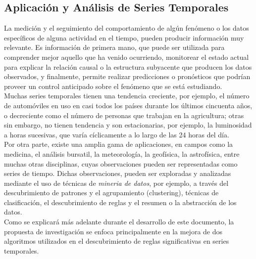 \subsection{Aplicaci\'on y An\'alisis de Series Temporales}
La medici\'on y el seguimiento del comportamiento de alg\'un fen\'omeno o los datos espec\'ificos de alguna actividad en el tiempo, pueden producir informaci\'on muy relevante. Es informaci\'on de primera mano, que puede ser utilizada para comprender mejor aquello que ha venido ocurriendo, monitorear el estado actual para explicar la relaci\'on causal o la estructura subyacente que producen los datos observados, y finalmente, permite realizar predicciones o pron\'osticos que podr\'ian proveer un control anticipado sobre el fen\'omeno que se est\'a estudiando.\\
Muchas series temporales tienen una tendencia creciente, por ejemplo, el n\'umero de autom\'oviles en uso en casi todos los pa\'ises durante los \'ultimos cincuenta a\~nos, o decreciente como el n\'umero de personas que trabajan en la agricultura; otras sin embargo, no tienen tendencia y son estacionarias, por ejemplo, la luminosidad a horas sucesivas, que var\'ia c\'iclicamente a lo largo de las 24 horas del d\'ia.\\
Por otra parte, existe una amplia gama de aplicaciones, en campos como la medicina, el an\'alisis bursatil, la meteorolog\'ia, la geof\'isica, la astrof\'isica, entre muchas otras disciplinas, cuyas observaciones pueden ser representadas como series de tiempo. Dichas observaciones, pueden ser exploradas y analizadas mediante el uso de t\'ecnicas de \textit{mineria de datos}, por ejemplo, a trav\'es del descubrimiento de patrones y el agrupamiento (clustering), t\'ecnicas  de clasificaci\'on, el descubrimiento de reglas y el resumen o la abstracci\'on de los datos.\\
Como se explicar\'a m\'as adelante durante el desarrollo de este documento, la propuesta de investigaci\'on se enfoca principalmente en la mejora de dos algoritmos utilizados en el descubrimiento de reglas significativas en series temporales.
